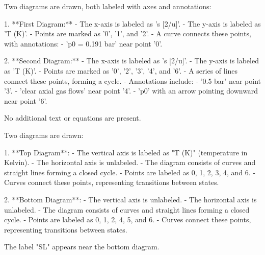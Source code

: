 Two diagrams are drawn, both labeled with axes and annotations:  

1. **First Diagram:**  
   - The x-axis is labeled as 's [2/u]'.  
   - The y-axis is labeled as 'T (K)'.  
   - Points are marked as '0', '1', and '2'.  
   - A curve connects these points, with annotations:  
     - 'p0 = 0.191 bar' near point '0'.  

2. **Second Diagram:**  
   - The x-axis is labeled as 's [2/u]'.  
   - The y-axis is labeled as 'T (K)'.  
   - Points are marked as '0', '2', '3', '4', and '6'.  
   - A series of lines connect these points, forming a cycle.  
   - Annotations include:  
     - '0.5 bar' near point '3'.  
     - 'clear axial gas flows' near point '4'.  
     - 'p0' with an arrow pointing downward near point '6'.  

No additional text or equations are present.

Two diagrams are drawn:  

1. **Top Diagram**:  
   - The vertical axis is labeled as "T (K)" (temperature in Kelvin).  
   - The horizontal axis is unlabeled.  
   - The diagram consists of curves and straight lines forming a closed cycle.  
   - Points are labeled as 0, 1, 2, 3, 4, and 6.  
   - Curves connect these points, representing transitions between states.  

2. **Bottom Diagram**:  
   - The vertical axis is unlabeled.  
   - The horizontal axis is unlabeled.  
   - The diagram consists of curves and straight lines forming a closed cycle.  
   - Points are labeled as 0, 1, 2, 4, 5, and 6.  
   - Curves connect these points, representing transitions between states.  

The label "SL" appears near the bottom diagram.